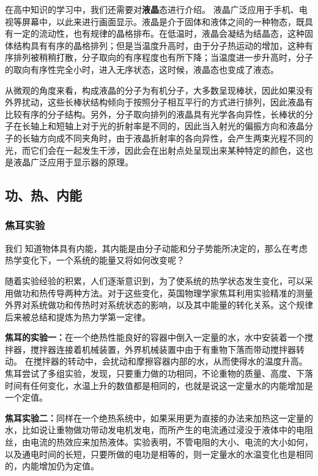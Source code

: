 在高中知识的学习中，我们还需要对\textbf{液晶}态进行介绍。 液晶广泛应用于手机、电视等屏幕中，以此来进行画面显示。液晶是介于固体和液体之间的一种物态，既具有一定的流动性，也有规律的晶格排布。在低温时，液晶会凝结为结晶态，这种固体结构具有有序的晶格排列；但是当温度升高时，由于分子热运动的增加，这种有序排列被稍稍打散，分子取向的有序程度也有所下降；当温度进一步升高时，分子的取向有序性完全小时，进入无序状态，这时候，液晶态也变成了液态。

从微观的角度来看，构成液晶的分子为有机分子，大多数呈现棒状，因此如果没有外界扰动，这些长棒状结构倾向于按照分子相互平行的方式进行排列，因此液晶有比较有序的分子结构。另外，分子取向排列的液晶具有光学各向异性，长棒状的分子在长轴上和短轴上对于光的折射率是不同的，因此当入射光的偏振方向和液晶分子的长轴方向成不同夹角时，由于液晶折射率的各向异性，会产生两束光程不同的光，而它们会在一起发生干涉，因此会在出射点处呈现出来某种特定的颜色，这也是液晶广泛应用于显示器的原理。

\subsection{功、热、内能}
\subsubsection{焦耳实验}
我们
知道物体具有内能，其内能是由分子动能和分子势能所决定的，那么在考虑热学变化下，一个系统的能量又将如何改变呢？

随着实验经验的积累，人们逐渐意识到，为了使系统的热学状态发生变化，可以采用做功和热传导两种方法。对于这些变化，英国物理学家焦耳利用实验精准的测量外界对系统做功和传热时对系统状态的影响，以及其中能量的转化关系。这个规律后来被总结和提炼为热力学第一定律。

\textbf{焦耳的实验一：}在一个绝热性能良好的容器中倒入一定量的水，水中安装着一个搅拌器，搅拌器连接着机械装置，外界机械装置中由于有重物下落而带动搅拌器转动。
在搅拌器的转动中，会扰动和摩擦容器内部的水，从而使得水的温度升高。焦耳尝试了多组实验，发现，只要重力做的功相同，不论重物的质量、高度、下落时间有任何变化，水温上升的数值都是相同的，也就是说这一定量水的内能增加是一个定值。%

\textbf{焦耳实验二：}同样在一个绝热系统中，如果采用更为直接的办法来加热这一定量的水，比如说让重物做功带动发电机发电，而所产生的电流通过浸没于液体中的电阻丝，由电流的热效应来加热液体。实验表明，不管电阻的大小、电流的大小如何，以及通电时间的长短，只要所做的电功是相等的，则一定量水的水温变化也是相同的，内能增加仍为定值。

